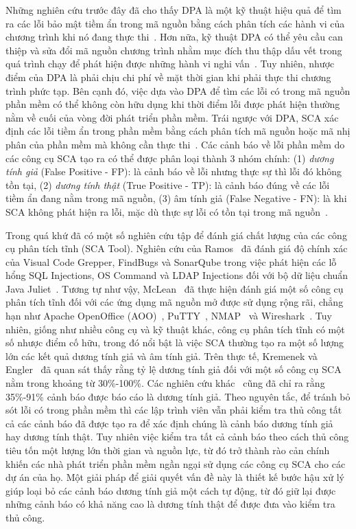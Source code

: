 Những nghiên cứu trước đây đã cho thấy DPA là một kỹ thuật hiệu quả để tìm ra các lỗi bảo mật tiềm ẩn trong mã nguồn bằng cách phân tích các hành vi của chương trình khi nó đang thực thi~\cite{andreasen2017survey}. Hơn nữa, kỹ thuật DPA có thể yêu cầu can thiệp và sửa đổi mã nguồn chương trình nhằm mục đích thu thập dấu vết trong quá trình chạy để phát hiện được những hành vi nghi vấn~\cite{larus1994rewriting}. Tuy nhiên, nhược điểm của DPA là phải chịu chi phí về mặt thời gian khi phải thực thi chương trình phức tạp. Bên cạnh đó, việc dựa vào DPA để tìm các lỗi có trong mã nguồn phần mềm có thể không còn hữu dụng khi thời điểm lỗi được phát hiện thường nằm về cuối của vòng đời phát triển phần mềm. Trái ngược với DPA, SCA xác định các lỗi tiềm ẩn trong phần mềm bằng cách phân tích mã nguồn hoặc mã nhị phân của phần mềm mà không cần thực thi~\cite{zheng2006value}. Các cảnh báo về lỗi phần mềm do các công cụ SCA tạo ra có thể được phân loại thành 3 nhóm chính: (1) \textit{dương tính giả} (False Positive - FP): là cảnh báo về lỗi nhưng thực sự thì lỗi đó không tồn tại, (2) \textit{dương tính thật} (True Positive - TP): là cảnh báo đúng về các lỗi tiềm ẩn đang nằm trong mã nguồn, (3) {âm tính giả} (False Negative - FN): là khi SCA không phát hiện ra lỗi, mặc dù thực sự lỗi có tồn tại trong mã nguồn~\cite{alikhashashneh2018using}.

Trong quá khứ đã có một số nghiên cứu tập để đánh giá chất lượng của các công cụ phân tích tĩnh (SCA Tool). Nghiên cứu của Ramos~\cite{ramos2016evaluating} đã đánh giá độ chính xác của Visual Code Grepper, FindBugs và SonarQube trong việc phát hiện các lỗ hổng SQL Injections, OS Command và LDAP Injections đối với bộ dữ liệu chuẩn Java Juliet~\cite{JULIET}. Tương tự như vậy, McLean~\cite{mclean2012comparing} đã thực hiện đánh giá một số công cụ phân tích tĩnh đối với các ứng dụng mã nguồn mở được sử dụng rộng rãi, chẳng hạn như Apache OpenOffice (AOO)~\cite{steinberg2013apache}, PuTTY~\cite{dooley2006cisco}, NMAP~\cite{lyon2008nmap} và Wireshark~\cite{orebaugh2006wireshark}. Tuy nhiên, giống như nhiều công cụ và kỹ thuật khác, công cụ phân tích tĩnh có một số nhược điểm cố hữu, trong đó nổi bật là việc SCA thường tạo ra một số lượng lớn các kết quả dương tính giả và âm tính giả. Trên thực tế, Kremenek và Engler~\cite{kremenek2003z} đã quan sát thấy rằng tỷ lệ dương tính giả đối với một số công cụ SCA nằm trong khoảng từ 30\%-100\%. Các nghiên cứu khác~\cite{boogerd2006prioritizing,heckman2008establishing} cũng đã chỉ ra rằng 35\%-91\% cảnh báo được báo cáo là dương tính giả. Theo nguyên tắc, để tránh bỏ sót lỗi có trong phần mềm thì các lập trình viên vẫn phải kiểm tra thủ công tất cả các cảnh báo đã được tạo ra để xác định chúng là cảnh báo dương tính giả hay dương tính thật. Tuy nhiên việc kiểm tra tất cả cảnh báo theo cách thủ công tiêu tốn một lượng lớn thời gian và nguồn lực, từ đó trở thành rào cản chính khiến các nhà phát triển phần mềm ngần ngại sử dụng các công cụ SCA cho các dự án của họ. Một giải pháp để giải quyết vấn đề này là thiết kế bước hậu xử lý giúp loại bỏ các cảnh báo dương tính giả một cách tự động, từ đó giữ lại được những cảnh báo có khả năng cao là dương tính thật để được đưa vào kiểm tra thủ công.

